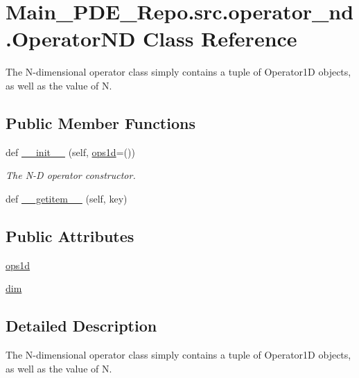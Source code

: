 \hypertarget{classMain__PDE__Repo_1_1src_1_1operator__nd_1_1OperatorND}{}\section{Main\+\_\+\+P\+D\+E\+\_\+\+Repo.\+src.\+operator\+\_\+nd.\+Operator\+ND Class Reference}
\label{classMain__PDE__Repo_1_1src_1_1operator__nd_1_1OperatorND}


The N-\/dimensional operator class simply contains a tuple of Operator1D objects, as well as the value of N.  


\subsection*{Public Member Functions}
\begin{DoxyCompactItemize}
\item 
def \hyperlink{classMain__PDE__Repo_1_1src_1_1operator__nd_1_1OperatorND_a3d6e107a1fc9f7111fc11cac4ab6744c}{\+\_\+\+\_\+init\+\_\+\+\_\+} (self, \hyperlink{classMain__PDE__Repo_1_1src_1_1operator__nd_1_1OperatorND_a2e8822f15abc5604dd0ba9c61528fb68}{ops1d}=())
\begin{DoxyCompactList}\small\item\em The N-\/D operator constructor. \end{DoxyCompactList}\item 
def \hyperlink{classMain__PDE__Repo_1_1src_1_1operator__nd_1_1OperatorND_a7d63789b13a1853c6d28dd953c77b8d5}{\+\_\+\+\_\+getitem\+\_\+\+\_\+} (self, key)
\end{DoxyCompactItemize}
\subsection*{Public Attributes}
\begin{DoxyCompactItemize}
\item 
\hyperlink{classMain__PDE__Repo_1_1src_1_1operator__nd_1_1OperatorND_a2e8822f15abc5604dd0ba9c61528fb68}{ops1d}
\item 
\hyperlink{classMain__PDE__Repo_1_1src_1_1operator__nd_1_1OperatorND_a46df4cd21842a04ac2daa3e1a7a70fd8}{dim}
\end{DoxyCompactItemize}


\subsection{Detailed Description}
The N-\/dimensional operator class simply contains a tuple of Operator1D objects, as well as the value of N. 

